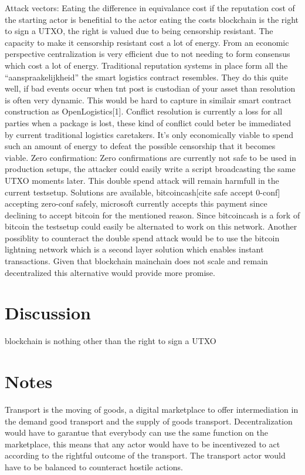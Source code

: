 \documentclass[Nomencl]{DylanMaster}
\begin{document}
Attack vectors:
Eating the difference in equivalance cost if the reputation cost of the starting actor is benefitial to the actor eating the costs
blockchain is the right to sign a UTXO, the right is valued due to being censorship resistant. The capacity to make it censorship resistant cost a lot of energy. From an economic perspective centralization is very efficient due to not needing to form consensus which cost a lot of energy. Traditional reputation systems in place form all the “aanspraakelijkheid” the smart logistics contract resembles. They do this quite well, if bad events occur  when tnt post is custodian of your asset than resolution is often very dynamic. This would be hard to capture in similair smart contract construction as OpenLogistics[1]. Conflict resolution is currently a loss for all parties when a package is lost, these kind of conflict could beter be immediated by current traditional logistics caretakers.
 It’s only economically viable to spend such an amount of energy to defeat the possible censorship that it becomes viable.
Zero confirmation:
Zero confirmations are currently not safe to be used in production setups, the attacker could easily write a script broadcasting the same UTXO moments later. This double spend attack will remain harmfull in the current testsetup. Solutions are available, bitcoincash[cite safe accept 0-conf] accepting zero-conf safely, microsoft currently accepts this payment since declining to accept bitcoin for the mentioned reason. Since bitcoincash is a fork of bitcoin the testsetup could easily be alternated to work on this network. Another possiblity to counteract the double spend attack would be to use the bitcoin lightning network which is a second layer solution which enables instant transactions. Given that blockchain mainchain does not scale and remain decentralized this alternative would provide more promise.

\section{Discussion}

blockchain is nothing other than the right to sign a UTXO

\section{Notes}

Transport is the moving of goods, a digital marketplace to offer intermediation in the demand good transport and the supply of goods transport. Decentralization would have to garantue that everybody can use the same function on the marketplace, this means that any actor would have to be incentivezed to act according to the rightful outcome of the transport. The transport actor would have to be balanced to counteract hostile actions.
\end{document}
